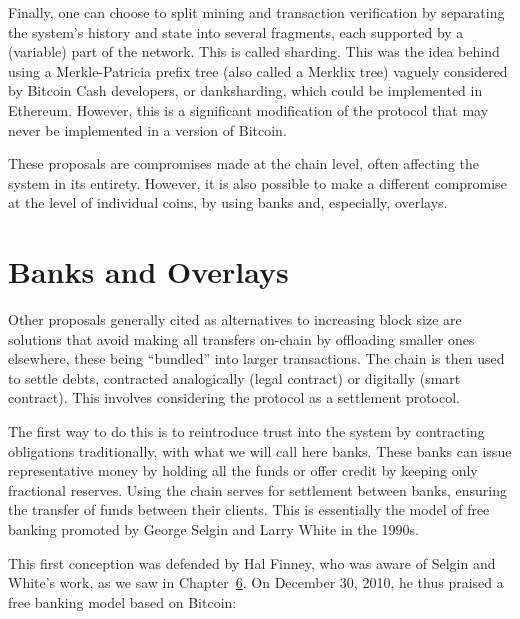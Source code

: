 \documentclass[
  a5paper,
  smalldemyvopaper,10pt,twoside,onecolumn,openright,extrafontsizes,hidelinks]{memoir}
\begin{document}
Finally, one can choose to split mining and transaction verification by
separating the system's history and state into several fragments, each
supported by a (variable) part of the network. This is called sharding.
This was the idea behind using a Merkle-Patricia prefix tree (also
called a Merklix tree) vaguely considered by Bitcoin Cash developers, or
danksharding, which could be implemented in Ethereum. However, this is a
significant modification of the protocol that may never be implemented
in a version of Bitcoin.

These proposals are compromises made at the chain level, often affecting
the system in its entirety. However, it is also possible to make a
different compromise at the level of individual coins, by using banks
and, especially, overlays.

\section*{Banks and Overlays}\label{banks-and-overlays}


Other proposals generally cited as alternatives to increasing block size
are solutions that avoid making all transfers on-chain by offloading
smaller ones elsewhere, these being ``bundled'' into larger
transactions. The chain is then used to settle debts, contracted
analogically (legal contract) or digitally (smart contract). This
involves considering the protocol as a settlement protocol.

The first way to do this is to reintroduce trust into the system by
contracting obligations traditionally, with what we will call here
banks. These banks can issue representative money by holding all the
funds or offer credit by keeping only fractional reserves. Using the
chain serves for settlement between banks, ensuring the transfer of
funds between their clients. This is essentially the model of free
banking promoted by George Selgin and Larry White in the 1990s.

This first conception was defended by Hal Finney, who was aware of
Selgin and White's work, as we saw in
Chapter~\hyperref[ch:cybermonnaie]{6}. On December 30, 2010, he thus
praised a free banking model based on Bitcoin:
\end{document}
